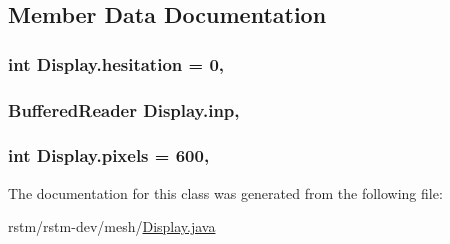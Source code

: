\subsection{Member Data Documentation}
\hypertarget{classDisplay_a729577a067708ad0dfcb58cee0b52edc}{
\subsubsection[{hesitation}]{\setlength{\rightskip}{0pt plus 5cm}int Display.\-hesitation = 0\hspace{0.3cm}{\ttfamily [static]}, {\ttfamily [private]}}}\label{classDisplay_a729577a067708ad0dfcb58cee0b52edc}
\hypertarget{classDisplay_ab1275d12db7247b4fb90a12736d6cd09}{
\subsubsection[{inp}]{\setlength{\rightskip}{0pt plus 5cm}Buffered\-Reader Display.\-inp\hspace{0.3cm}{\ttfamily [static]}, {\ttfamily [private]}}}\label{classDisplay_ab1275d12db7247b4fb90a12736d6cd09}
\hypertarget{classDisplay_a247c0c4133ed9473291fffb5fb306eb6}{
\subsubsection[{pixels}]{\setlength{\rightskip}{0pt plus 5cm}int Display.\-pixels = 600\hspace{0.3cm}{\ttfamily [static]}, {\ttfamily [private]}}}\label{classDisplay_a247c0c4133ed9473291fffb5fb306eb6}


The documentation for this class was generated from the following file\-:\begin{DoxyCompactItemize}
\item 
rstm/rstm-\/dev/mesh/\hyperlink{Display_8java}{Display.\-java}\end{DoxyCompactItemize}
